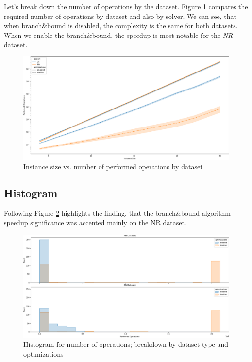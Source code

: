 \documentclass[a4paper,10pt]{article}
\begin{document}
Let's break down the number of operations by the dataset. Figure \ref{size_vs_ops_lineplot} compares the required number of operations by dataset and also by solver. We can see, that when branch\&bound is disabled, the complexity is the same for both datasets. When we enable the branch\&bound, the speedup is most notable for the \emph{NR} dataset.

\begin{figure}[!htb]
	\centering
  	\includegraphics[width=\textwidth]{size_vs_ops_lineplot.png}
	\caption{Instance size vs. number of performed operations by dataset}
	\label{size_vs_ops_lineplot}
\end{figure}

\clearpage

\subsection{Histogram}
Following Figure \ref{size_20_hist} highlights the finding, that the branch\&bound algorithm speedup significance was accented mainly on the NR dataset.

\begin{figure}[!htb]
	\centering
  	\includegraphics[width=\textwidth]{size_20_hist.png}
	\caption{Histogram for number of operations; breakdown by dataset type and optimizations}
	\label{size_20_hist}
\end{figure}
\end{document}
